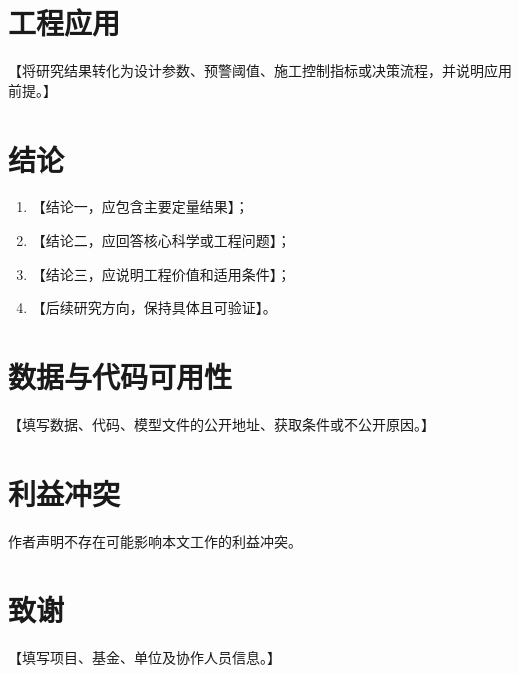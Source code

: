 \documentclass[UTF8,zihao=-5,twoside]{ctexart}
\numberwithin{equation}{section}
\newcommand{\placeholder}[1]{\textcolor{paperblack}{【#1】}}
\begin{document}
\section{工程应用}

\placeholder{将研究结果转化为设计参数、预警阈值、施工控制指标或决策流程，并说明应用前提。}

\section{结论}

\begin{enumerate}
  \item \placeholder{结论一，应包含主要定量结果}；
  \item \placeholder{结论二，应回答核心科学或工程问题}；
  \item \placeholder{结论三，应说明工程价值和适用条件}；
  \item \placeholder{后续研究方向，保持具体且可验证}。
\end{enumerate}

\section*{数据与代码可用性}
\placeholder{填写数据、代码、模型文件的公开地址、获取条件或不公开原因。}

\section*{利益冲突}
作者声明不存在可能影响本文工作的利益冲突。

\section*{致谢}
\placeholder{填写项目、基金、单位及协作人员信息。}

\printbibliography[heading=bibintoc,title={参考文献}]
\end{document}
